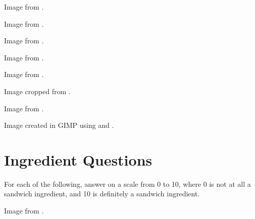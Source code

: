	\begin{minipage}{\textwidth}
		Image from \cite{toastSandwich}.
	\end{minipage}

	\begin{minipage}{\textwidth}
		Image from \cite{oreo}.
	\end{minipage}

	\begin{minipage}{\textwidth}
		Image from \cite{ritzCracker}.
	\end{minipage}

	\begin{minipage}{\textwidth}
		Image from \cite{sushiBurrito}.
	\end{minipage}

	\begin{minipage}{\textwidth}
		Image from \cite{nigiri}.
	\end{minipage}

	\begin{minipage}{\textwidth}
		Image cropped from \cite{cheese}.
	\end{minipage}

	\begin{minipage}{\textwidth}
		Image from \cite{salad}.
	\end{minipage}

	\begin{minipage}{\textwidth}
		Image created in GIMP using \cite{breadSlices} and \cite{brick}.
	\end{minipage}

\clearpage
\section{Ingredient Questions}
	For each of the following, answer on a scale from 0 to 10, where 0 is not at all a sandwich ingredient, and 10 is definitely a sandwich ingredient.

	\begin{minipage}{\textwidth}
		Image from \cite{coldCuts}.
	\end{minipage}

